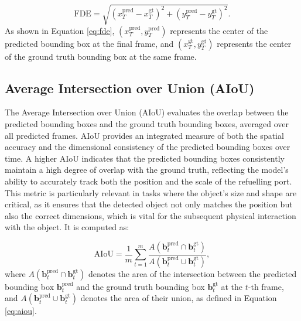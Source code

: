 \documentclass[12pt,oneside]{book} %
\begin{document}
\begin{equation}
    \text{FDE} = \sqrt{(x_T^{\text{pred}} - x_T^{\text{gt}})^2 + (y_T^{\text{pred}} - y_T^{\text{gt}})^2}. \label{eq:fde}
\end{equation}
As shown in Equation \eqref{eq:fde}, \((x_T^{\text{pred}}, y_T^{\text{pred}})\)
represents the center of the predicted bounding box at the final frame, and
\((x_T^{\text{gt}}, y_T^{\text{gt}})\) represents the center of the ground
truth bounding box at the same frame.

\subsection*{Average Intersection over Union (AIoU)}
\noindent The Average Intersection over Union (AIoU) evaluates the overlap between the predicted bounding boxes and the ground truth bounding boxes, averaged over all predicted frames. AIoU provides an integrated measure of both the spatial accuracy and the dimensional consistency of the predicted bounding boxes over time. A higher AIoU indicates that the predicted bounding boxes consistently maintain a high degree of overlap with the ground truth, reflecting the model’s ability to accurately track both the position and the scale of the refuelling port. This metric is particularly relevant in tasks where the object’s size and shape are critical, as it ensures that the detected object not only matches the position but also the correct dimensions, which is vital for the subsequent physical interaction with the object. It is computed as:

\begin{equation}
    \text{AIoU} = \frac{1}{m} \sum_{t=1}^{m} \frac{A(\mathbf{b}_t^{\text{pred}} \cap \mathbf{b}_t^{\text{gt}})}{A(\mathbf{b}_t^{\text{pred}} \cup \mathbf{b}_t^{\text{gt}})}, \label{eq:aiou}
\end{equation}
where \(A(\mathbf{b}_t^{\text{pred}} \cap \mathbf{b}_t^{\text{gt}})\) denotes
the area of the intersection between the predicted bounding box
\(\mathbf{b}_t^{\text{pred}}\) and the ground truth bounding box
\(\mathbf{b}_t^{\text{gt}}\) at the \(t\)-th frame, and
\(A(\mathbf{b}_t^{\text{pred}} \cup \mathbf{b}_t^{\text{gt}})\) denotes the
area of their union, as defined in Equation \eqref{eq:aiou}.
\end{document}
